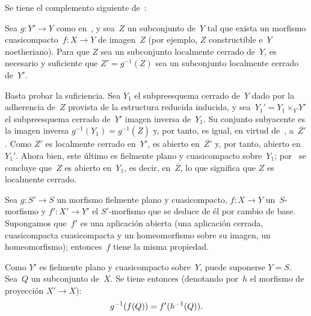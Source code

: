 Se tiene el complemento siguiente de~:

\begin{corollaire}
\label{VIII.4.5}
Sea $g\colon Y'\to Y$ como en~, y sea~$Z$ un subconjunto
de~$Y$ tal que exista un morfismo cuasicompacto~$f\colon X\to Y$ de
imagen~$Z$ (por ejemplo, $Z$ constructible e~$Y$ noetheriano). Para que
$Z$ sea un subconjunto localmente cerrado de~$Y$, es necesario y suficiente
que $Z'=g^{-1}(Z)$ sea un subconjunto localmente cerrado de~$Y'$.
\end{corollaire}

Basta probar la suficiencia. Sea $Y_{1}$ el subpreesquema cerrado de~$Y$
dado por la adherencia de~$Z$ provista de la estructura reducida inducida,
y sea~$Y_{1}'=Y_{1}\times_{Y}Y'$ el subpreesquema cerrado de~$Y'$ imagen
inversa de~$Y_{1}$. Su conjunto subyacente es la imagen inversa
$g^{-1}(Y_{1})=g^{-1}(\overline{Z})$ y, por tanto, es igual, en virtud
de~, a~$\overline{Z'}$. Como $Z'$ es localmente cerrado
en~$Y'$, es abierto en~$\overline{Z'}$ y, por tanto, abierto en~$Y_{1}'$.
Ahora bien, este último es fielmente plano y cuasicompacto sobre~$Y_{1}$;
por~ se concluye que~$Z$ es abierto en~$Y_{1}$, es decir,
en~$\overline{Z}$, lo que significa que $Z$ es localmente cerrado.

\begin{corollaire}
\label{VIII.4.6}
Sea $g\colon S'\to S$ un morfismo fielmente plano y cuasicompacto,
$f\colon X\to Y$ un~$S$-morfismo y $f'\colon X'\to Y'$ el
$S'$-morfismo que se deduce de él por cambio de base. Supongamos que~$f'$
es una aplicación abierta (\resp una aplicación cerrada, \resp
{}
{cuasicompacta}
{cuasicompacta}
y un homeomorfismo sobre su imagen, \resp un homeomorfismo); entonces~$f$
tiene la misma propiedad.
\end{corollaire}

Como $Y'$ es fielmente plano y cuasicompacto sobre~$Y$, puede suponerse
$Y=S$. Sea~$Q$
un subconjunto de~$X$. Se tiene entonces (denotando por~$h$ el morfismo de
proyección $X'\to X$):
$$
g^{-1}(f(Q))=f'(h^{-1}(Q)).
$$

